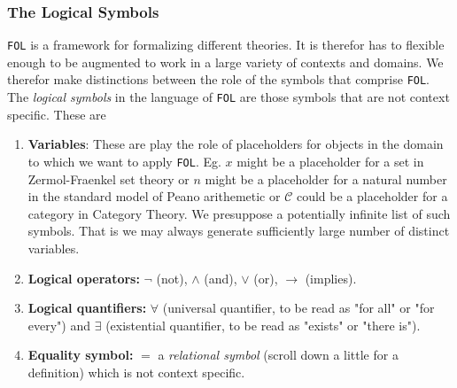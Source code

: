 \subsubsection*{The Logical Symbols}
\verb|FOL| is a framework for formalizing different theories. It is therefor has to flexible enough to be augmented to work in a large variety of contexts and domains. We therefor make distinctions between the role of the symbols that comprise \verb|FOL|. The \emph{logical symbols} in the language of \verb|FOL| are those symbols that are not context specific. These are 
\begin{enumerate}
    \item \textbf{Variables}: These are play the role of placeholders for objects in the domain to which we want to apply \verb|FOL|. Eg. $x$ might be a placeholder for a set in Zermol-Fraenkel set theory or $n$ might be a placeholder for a natural number in the standard model of Peano arithemetic or $\mathcal{C}$ could be a placeholder for a category in Category Theory. We presuppose a potentially infinite list of such symbols. That is we may always generate sufficiently large number of distinct variables.
    \item \textbf{Logical operators:} $\neg$ (not), $\wedge$ (and), $\vee$ (or), $\to$ (implies).
    \item \textbf{Logical quantifiers:} $\forall$ (universal quantifier, to be read as "for all" or "for every") and $\exists$ (existential quantifier, to be read as "exists" or "there is").
    \item \textbf{Equality symbol:} $=$ a \emph{relational symbol} (scroll down a little for a definition) which is not context specific.    
\end{enumerate}
